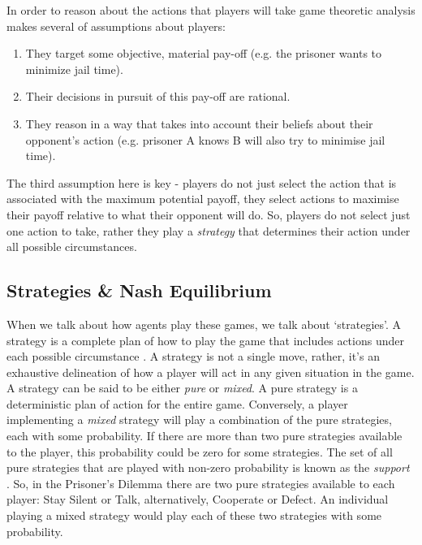 \documentclass[11pt]{book}
\newcommand*{\np}{\par\noindent\newline}
\begin{document}
\np In order to reason about the actions that players will take game theoretic
analysis makes several of assumptions about players:
\begin{enumerate}
    \item They target some objective, material pay-off (e.g. the prisoner wants
    to minimize jail time).
    \item Their decisions in pursuit of this pay-off are rational.
    \item They reason in a way that takes into account their beliefs about
    their opponent's action (e.g. prisoner A knows B will also try to minimise
    jail time). 
\end{enumerate}
\cite{osborne_course_1994}
\np The third assumption here is key - players do not just select the action
that is associated with the maximum potential payoff, they select actions to
maximise their payoff relative to what their opponent will do. So, players do
not select just one action to take, rather they play a \textit{strategy} that
determines their action under all possible circumstances.

\subsection{Strategies \& Nash Equilibrium}\label{strategies_nash}
When we talk about how agents play these games, we talk about `strategies'.
A strategy is a complete plan of how to play the game that includes actions under each possible circumstance \citep{angner_course_2012}.
A strategy is not a single move, rather, it's an exhaustive delineation of how a player will act in any given situation in the game. 
A strategy can be said to be either \textit{pure} or \textit{mixed}.
A pure strategy is a deterministic plan of action for the entire game.
Conversely, a player implementing a \textit{mixed} strategy will play a combination of the pure strategies, each with some probability. 
If there are more than two pure strategies available to the player, this probability could be zero for some strategies.
The set of all pure strategies that are played with non-zero probability is known as the \textit{support} \citep[~p. 102]{shoham_multiagent_2008}.
So, in the Prisoner's Dilemma there are two pure strategies available to each player: Stay Silent or Talk, alternatively, Cooperate or Defect.
An individual playing a mixed strategy would play each of these two strategies with some probability.
\end{document}
